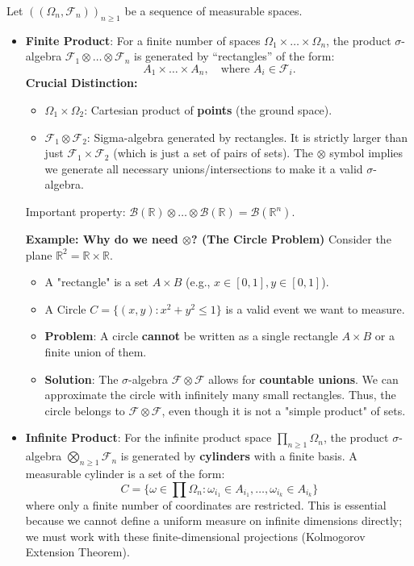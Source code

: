 Let $((\Omega_n, \mathcal{F}_n))_{n \geq 1}$ be a sequence of measurable spaces.
\begin{itemize}
    \item \textbf{Finite Product}: For a finite number of spaces $\Omega_1 \times \dots \times \Omega_n$, the product \texorpdfstring{$\sigma$-}{sigma-}algebra $\mathcal{F}_1 \otimes \dots \otimes \mathcal{F}_n$ is generated by ``rectangles'' of the form:
    \[
    A_1 \times \dots \times A_n, \quad \text{where } A_i \in \mathcal{F}_i.
    \]
    \textbf{Crucial Distinction:}
    \begin{itemize}
        \item $\Omega_1 \times \Omega_2$: Cartesian product of \textbf{points} (the ground space).
        \item $\mathcal{F}_1 \otimes \mathcal{F}_2$: Sigma-algebra generated by rectangles. It is strictly larger than just $\mathcal{F}_1 \times \mathcal{F}_2$ (which is just a set of pairs of sets). The $\otimes$ symbol implies we generate all necessary unions/intersections to make it a valid $\sigma$-algebra.
    \end{itemize}
    Important property: $\mathcal{B}(\mathbb{R}) \otimes \dots \otimes \mathcal{B}(\mathbb{R}) = \mathcal{B}(\mathbb{R}^n)$.
    
    \textbf{Example: Why do we need $\otimes$? (The Circle Problem)}
    Consider the plane $\mathbb{R}^2 = \mathbb{R} \times \mathbb{R}$.
    \begin{itemize}
        \item A "rectangle" is a set $A \times B$ (e.g., $x \in [0,1], y \in [0,1]$).
        \item A Circle $C = \{ (x,y) : x^2 + y^2 \leq 1 \}$ is a valid event we want to measure.
        \item \textbf{Problem}: A circle \textbf{cannot} be written as a single rectangle $A \times B$ or a finite union of them.
        \item \textbf{Solution}: The $\sigma$-algebra $\mathcal{F} \otimes \mathcal{F}$ allows for \textbf{countable unions}. We can approximate the circle with infinitely many small rectangles. Thus, the circle belongs to $\mathcal{F} \otimes \mathcal{F}$, even though it is not a "simple product" of sets.
    \end{itemize}
    
    \item \textbf{Infinite Product}: For the infinite product space $\prod_{n \geq 1} \Omega_n$, the product $\sigma$-algebra $\bigotimes_{n \geq 1} \mathcal{F}_n$ is generated by \textbf{cylinders} with a finite basis. A measurable cylinder is a set of the form:
    \[
    C = \{ \omega \in \prod \Omega_n : \omega_{i_1} \in A_{i_1}, \dots, \omega_{i_k} \in A_{i_k} \}
    \]
    where only a finite number of coordinates are restricted. This is essential because we cannot define a uniform measure on infinite dimensions directly; we must work with these finite-dimensional projections (Kolmogorov Extension Theorem).
\end{itemize}

